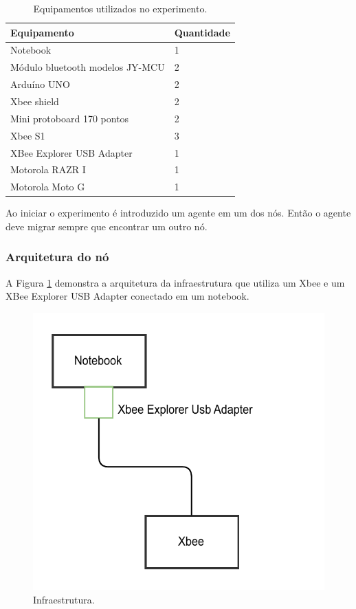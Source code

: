 \begin{table}[ht]
	\caption{Equipamentos utilizados no experimento.}
	\centering
	\begin{tabular}{|l|l|}
		\hline
		Equipamento & Quantidade \\ \hline
		Notebook & 1 \\ \hline 
		Módulo bluetooth modelos JY-MCU & 2 \\ \hline
		Arduíno UNO & 2 \\ \hline
		Xbee shield & 2 \\ \hline
		Mini protoboard 170 pontos & 2 \\ \hline
		Xbee S1 & 3 \\ \hline
		XBee Explorer USB Adapter & 1 \\ \hline 
		Motorola RAZR I & 1 \\ \hline
		Motorola Moto G & 1 \\ \hline
	\end{tabular}
	\label{tab:componentesPrototipo}
\end{table}

Ao iniciar o experimento é introduzido um agente em um dos nós. Então o agente deve migrar sempre que encontrar um outro nó.

\subsubsection{Arquitetura do nó}

A Figura \ref{fig:arquiteturaPrototipoInfraestrtura} demonstra a arquitetura da infraestrutura que utiliza um Xbee e um XBee Explorer USB Adapter conectado em um notebook.

\begin{figure}[htbp]
	\centering
	\includegraphics[scale=0.5]{metodologia/figuras/arquiteturaPrototipoInfraestrtura.pdf}
	\caption{Infraestrutura.}
	\label{fig:arquiteturaPrototipoInfraestrtura}
\end{figure}

